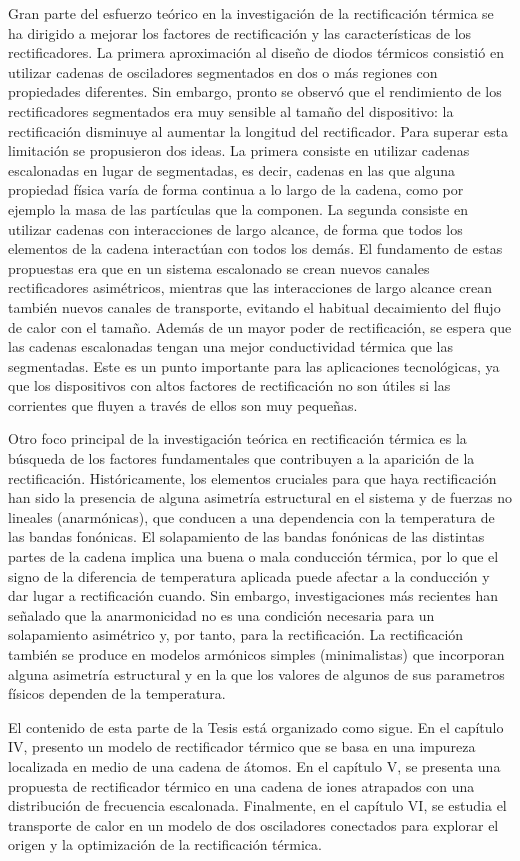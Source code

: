 Gran parte del esfuerzo teórico en la investigación de la rectificación térmica se ha dirigido a mejorar los factores de rectificación y las características de los rectificadores. La primera aproximación al diseño de diodos térmicos consistió en utilizar cadenas de osciladores segmentados en dos o más regiones con propiedades diferentes. Sin embargo, pronto se observó que el rendimiento de los rectificadores segmentados era muy sensible al tamaño del dispositivo: la rectificación disminuye al aumentar la longitud del rectificador. Para superar esta limitación se propusieron dos ideas. La primera consiste en utilizar cadenas escalonadas en lugar de segmentadas, es decir, cadenas en las que alguna propiedad física varía de forma continua a lo largo de la cadena, como por ejemplo la masa de las partículas que la componen. La segunda consiste en utilizar cadenas con interacciones de largo alcance, de forma que todos los elementos de la cadena interactúan con todos los demás. El fundamento de estas propuestas era que en un sistema escalonado se crean nuevos canales rectificadores asimétricos, mientras que las interacciones de largo alcance crean
también nuevos canales de transporte, evitando el habitual decaimiento del flujo de calor con el tamaño. Además de un mayor poder de rectificación, se espera que las cadenas escalonadas tengan una mejor conductividad térmica que las segmentadas. Este es un punto importante para las aplicaciones tecnológicas, ya que los dispositivos con altos factores de rectificación no son útiles si las corrientes que fluyen a través de ellos son muy pequeñas.

Otro foco principal de la investigación teórica en rectificación térmica es la búsqueda de los factores fundamentales que contribuyen a la aparición de la rectificación. Históricamente, los elementos cruciales para que haya rectificación han sido la presencia de alguna asimetría estructural en el sistema y de fuerzas no lineales (anarmónicas), que conducen a una dependencia con la temperatura de las bandas fonónicas. El solapamiento de las bandas fonónicas de las distintas partes de la cadena implica una buena o mala conducción térmica, por lo que el signo de la diferencia de temperatura aplicada puede afectar a la conducción y dar lugar a rectificación cuando. Sin embargo, investigaciones más recientes han señalado que la anarmonicidad no es una condición necesaria para un solapamiento asimétrico y, por tanto, para la rectificación. La rectificación también se produce en modelos armónicos simples (minimalistas) que incorporan alguna asimetría estructural y en la que los valores de algunos de sus parametros físicos dependen de la temperatura.

El contenido de esta parte de la Tesis está organizado como sigue. En el capítulo IV, presento un modelo de rectificador térmico que se basa en una impureza localizada en medio de una cadena de átomos. En el capítulo V, se presenta una propuesta de rectificador térmico en una cadena de iones atrapados con una distribución de frecuencia escalonada. Finalmente, en el capítulo VI, se estudia el transporte de calor en un modelo de dos osciladores conectados para explorar el origen y la optimización de la rectificación térmica.
